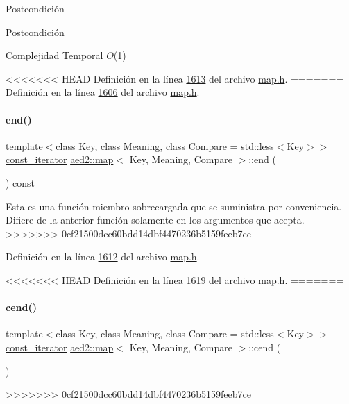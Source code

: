 \begin{DoxyPostcond}{\-Postcondición}
\begin{DoxyPostcond}{\-Postcondición}
\begin{DoxyDescription}
\item[Complejidad Temporal]$O$(1)
\end{DoxyDescription}

<<<<<<< HEAD
\-Definición en la línea \hyperlink{map_8h_source_l01613}{1613} del archivo \hyperlink{map_8h_source}{map.\-h}.
=======
Definición en la línea \hyperlink{map_8h_source_l01606}{1606} del archivo \hyperlink{map_8h_source}{map.\+h}.

\mbox{\label{classaed2_1_1map_a91e7cad1a638c55659c169d5574cd5d7_a91e7cad1a638c55659c169d5574cd5d7}} 
\paragraph{\texorpdfstring{end()}{end()}\hspace{0.1cm}{\footnotesize\ttfamily [2/2]}}
{\footnotesize\ttfamily template$<$class Key, class Meaning, class Compare = std\+::less$<$\+Key$>$$>$ \\
\hyperlink{classaed2_1_1map_1_1const__iterator}{const\+\_\+iterator} \hyperlink{classaed2_1_1map}{aed2\+::map}$<$ Key, Meaning, Compare $>$\+::end (\begin{DoxyParamCaption}{ }\end{DoxyParamCaption}) const\hspace{0.3cm}{\ttfamily [inline]}}

Esta es una función miembro sobrecargada que se suministra por conveniencia. Difiere de la anterior función solamente en los argumentos que acepta. 
>>>>>>> 0cf21500dcc60bdd14dbf4470236b5159feeb7ce

Definición en la línea \hyperlink{map_8h_source_l01612}{1612} del archivo \hyperlink{map_8h_source}{map.\+h}.

<<<<<<< HEAD
\-Definición en la línea \hyperlink{map_8h_source_l01619}{1619} del archivo \hyperlink{map_8h_source}{map.\-h}.
=======
\mbox{\label{classaed2_1_1map_a7bb91e94cbc875f1a011b142ef877912_a7bb91e94cbc875f1a011b142ef877912}} 
\paragraph{\texorpdfstring{cend()}{cend()}}
{\footnotesize\ttfamily template$<$class Key, class Meaning, class Compare = std\+::less$<$\+Key$>$$>$ \\
\hyperlink{classaed2_1_1map_1_1const__iterator}{const\+\_\+iterator} \hyperlink{classaed2_1_1map}{aed2\+::map}$<$ Key, Meaning, Compare $>$\+::cend (\begin{DoxyParamCaption}{ }\end{DoxyParamCaption})\hspace{0.3cm}{\ttfamily [inline]}}
>>>>>>> 0cf21500dcc60bdd14dbf4470236b5159feeb7ce


\end{DoxyPostcond}
\end{DoxyPostcond}
